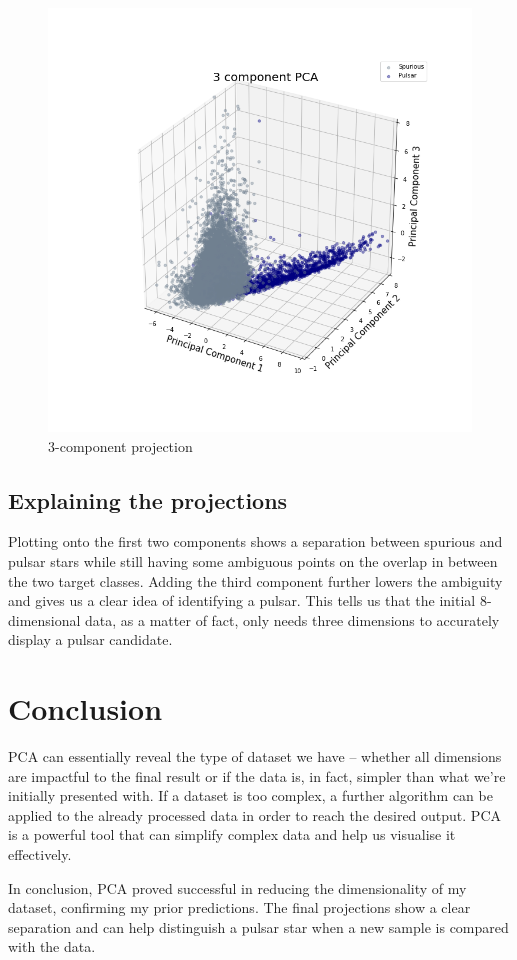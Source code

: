 \documentclass[a4paper,12pt]{article}
\begin{document}
    \begin{figure}[ht!]
        \centering
        \includegraphics[clip, trim = 0 3.5cm 0 3.2cm, height=.666\textwidth]{3component-projection}
        \caption{3-component projection}
    \end{figure}

    \newpage

    \subsection{Explaining the projections}
    Plotting onto the first two components shows a separation between spurious and pulsar stars while still having some ambiguous points on the overlap in between the two target classes. Adding the third component further lowers the ambiguity and gives us a clear idea of identifying a pulsar. This tells us that the initial 8-dimensional data, as a matter of fact, only needs three dimensions to accurately display a pulsar candidate.

    \section{Conclusion}
    PCA can essentially reveal the type of dataset we have – whether all dimensions are impactful to the final result or if the data is, in fact, simpler than what we’re initially presented with. If a dataset is too complex, a further algorithm can be applied to the already processed data in order to reach the desired output. PCA is a powerful tool that can simplify complex data and help us visualise it effectively.\par
    In conclusion, PCA proved successful in reducing the dimensionality of my dataset, confirming my prior predictions. The final projections show a clear separation and can help distinguish a pulsar star when a new sample is compared with the data.

    \newpage

    
    
\end{document}
